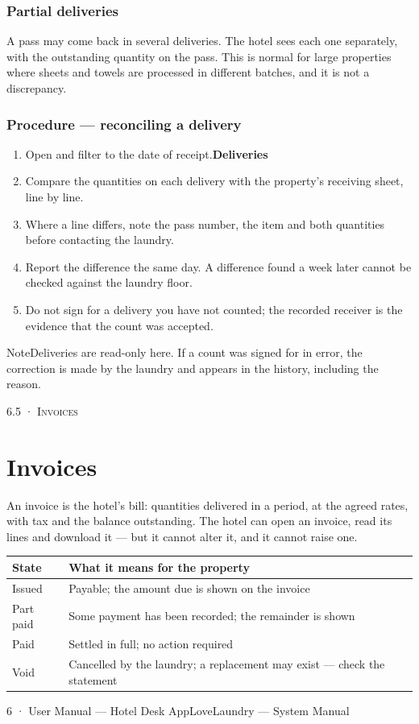 \documentclass[11pt,a4paper,oneside]{book}
\begin{document}
\subsubsection*{Partial deliveries}
A pass may come back in several deliveries. The hotel sees each one separately, with the outstanding quantity on the pass. This is normal for large properties where sheets and towels are processed in different batches, and it is not a discrepancy.

\subsubsection*{Procedure — reconciling a delivery}
\begin{enumerate}
\item Open  and filter to the date of receipt.\textbf{Deliveries}
\item Compare the quantities on each delivery with the property's receiving sheet, line by line.
\item Where a line differs, note the pass number, the item and both quantities before contacting the laundry.
\item Report the difference the same day. A difference found a week later cannot be checked against the laundry floor.
\item Do not sign for a delivery you have not counted; the recorded receiver is the evidence that the count was accepted.
\end{enumerate}
\begin{notebox}NoteDeliveries are read-only here. If a count was signed for in error, the correction is made by the laundry and appears in the history, including the reason.\end{notebox}
\textsc{\small\color{crimson}6.5 · Invoices}\par\medskip
\section*{Invoices}
An invoice is the hotel's bill: quantities delivered in a period, at the agreed rates, with tax and the balance outstanding. The hotel can open an invoice, read its lines and download it — but it cannot alter it, and it cannot raise one.

\begin{center}\small
\begin{tabularx}{\linewidth}{|X|X|}
\hline
\rowcolor{lightgrey}
\textbf{State} & \textbf{What it means for the property} \\ \hline
Issued & Payable; the amount due is shown on the invoice \\ \hline
Part paid & Some payment has been recorded; the remainder is shown \\ \hline
Paid & Settled in full; no action required \\ \hline
Void & Cancelled by the laundry; a replacement may exist — check the statement \\ \hline
\end{tabularx}
\end{center}
6 · User Manual — Hotel Desk AppLoveLaundry — System Manual
\end{document}
